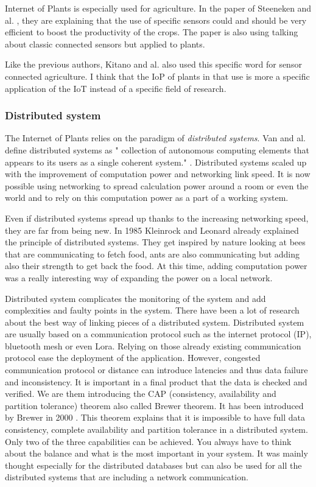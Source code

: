 Internet of Plants is especially used for agriculture. In the paper of Steeneken and al.
\cite{steenekenSensorsAgricultureInternet2023}, they are explaining that the use of specific
sensors could and should be very efficient to boost the productivity of the crops.
The paper is also using talking about classic connected sensors but applied to plants.

Like the previous authors, Kitano and al. \cite{kitanoInternetPlantsIoP2022} also used 
this specific word for sensor connected agriculture. I think that the IoP of plants in 
that use is more a specific application of the IoT instead of a specific field of research.

\subsubsection{Distributed system}

The Internet of Plants relies on the paradigm of \textit{distributed systems}. Van and al. define
distributed systems as " collection of autonomous computing elements that appears to its users as a single coherent system."
\cite{steenDistributedSystems2017}. 
Distributed systems scaled up with the improvement of computation power and networking link speed.
It is now possible using networking to spread calculation power around a room or even the world and to
rely on this computation power as a part of a working system.

Even if distributed systems spread up thanks to the increasing networking speed, they are far
from being new.
In 1985 Kleinrock and Leonard \cite{kleinrockDistributedSystems} already
explained the principle of distributed systems. They get inspired by nature looking at bees that are communicating to fetch food,
ants are also communicating but adding also their strength to get back the food.
At this time, adding computation power was a really interesting way of expanding the power on a local network.

Distributed system complicates the monitoring of the system and add complexities and faulty points in the system.
There have been a lot of
research about the best way of linking pieces of a distributed system. Distributed system are usually based on a 
communication protocol such as the internet protocol (IP), bluetooth mesh or even Lora.
Relying on those already existing communication protocol ease the deployment of the application.
However, congested communication protocol or distance can introduce latencies and thus data failure and inconsistency.
It is important in a final product that the data is checked and verified.
We are them introducing the CAP (consistency, availability and partition tolerance) theorem also called Brewer theorem.
It has been introduced by Brewer in 2000 \cite{brewerRobustDistributedSystems2000}.
This theorem explains that it is impossible to have full data consistency, complete availability and partition tolerance
in a distributed system. Only two of the three capabilities can be achieved.
You always have to think about the balance and what is the most important in your system.
It was mainly thought especially for the distributed databases but can also be used for all the distributed systems that are
including a network communication.

